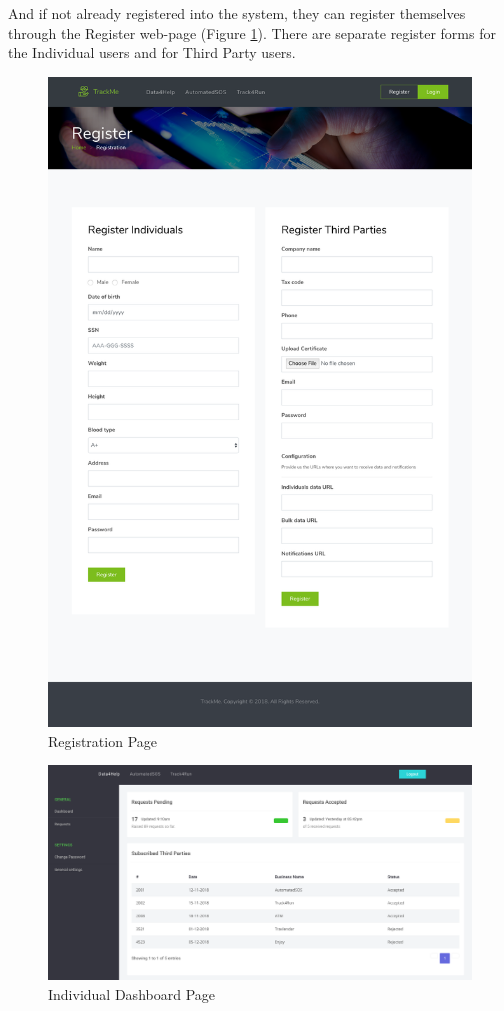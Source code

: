 \documentclass[a4paper, hidelinks, 12pt]{report}
\begin{document}
	 And if not already registered into the system, they can register themselves through the Register web-page (Figure \ref{fig:Registration}). There are separate register forms for the Individual users and for Third Party users.
	 \begin{figure}[H]
		\centering
		\includegraphics[scale=0.13]{UI/register.png}
		\caption[UI: Registration Page]{Registration Page}
		\label{fig:Registration}
	\end{figure}
	
	\begin{figure}[H]
		\centering
		\includegraphics[scale=0.35]{UI/dashboard_individual.png}
		\caption[UI: Individual Dashboard Page]{Individual Dashboard Page}
		\label{fig:Dashboard for individuals}
	\end{figure}
\end{document}
